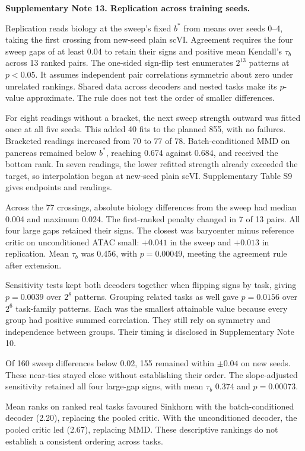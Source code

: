 \medskip\noindent\textbf{Supplementary Note 13. Replication across training seeds.}\par\smallskip
\begingroup\small\setlength{\parskip}{3pt}
Replication reads biology at the sweep's fixed $b^*$ from means over seeds 0--4, taking the first crossing from new-seed plain scVI. Agreement requires the four sweep gaps of at least 0.04 to retain their signs and positive mean Kendall's $\tau_b$ across 13 ranked pairs. The one-sided sign-flip test enumerates $2^{13}$ patterns at $p<0.05$. It assumes independent pair correlations symmetric about zero under unrelated rankings. Shared data across decoders and nested tasks make its $p$-value approximate. The rule does not test the order of smaller differences.

For eight readings without a bracket, the next sweep strength outward was fitted once at all five seeds. This added 40 fits to the planned 855, with no failures. Bracketed readings increased from 70 to 77 of 78. Batch-conditioned MMD on pancreas remained below $b^*$, reaching 0.674 against 0.684, and received the bottom rank. In seven readings, the lower refitted strength already exceeded the target, so interpolation began at new-seed plain scVI. Supplementary Table S9 gives endpoints and readings.

Across the 77 crossings, absolute biology differences from the sweep had median 0.004 and maximum 0.024. The first-ranked penalty changed in 7 of 13 pairs. All four large gaps retained their signs. The closest was barycenter minus reference critic on unconditioned ATAC small: $+0.041$ in the sweep and $+0.013$ in replication. Mean $\tau_b$ was 0.456, with $p=0.00049$, meeting the agreement rule after extension.

Sensitivity tests kept both decoders together when flipping signs by task, giving $p=0.0039$ over $2^8$ patterns. Grouping related tasks as well gave $p=0.0156$ over $2^6$ task-family patterns. Each was the smallest attainable value because every group had positive summed correlation. They still rely on symmetry and independence between groups. Their timing is disclosed in Supplementary Note 10.

Of 160 sweep differences below 0.02, 155 remained within $\pm0.04$ on new seeds. These near-ties stayed close without establishing their order. The slope-adjusted sensitivity retained all four large-gap signs, with mean $\tau_b$ 0.374 and $p=0.00073$.

Mean ranks on ranked real tasks favoured Sinkhorn with the batch-conditioned decoder (2.20), replacing the pooled critic. With the unconditioned decoder, the pooled critic led (2.67), replacing MMD. These descriptive rankings do not establish a consistent ordering across tasks.
\par\endgroup
